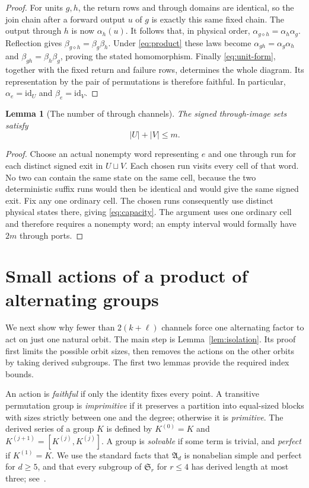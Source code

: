 \documentclass[11pt,a4paper]{article}
\newtheorem{lemma}[theorem]{Lemma}
\theoremstyle{definition}
\theoremstyle{remark}
\newcommand{\Alt}{\mathfrak A}
\newcommand{\Sym}{\mathfrak S}
\begin{document}
\begin{proof}
For units $g,h$, the return rows and through domains are identical,
so the join chain after a forward output $u$ of $g$ is exactly this
same fixed chain. The output through $h$ is now $\alpha_h(u)$.
It follows that, in physical order,
$\alpha_{g\diamond h}=\alpha_h\alpha_g$. Reflection gives
$\beta_{g\diamond h}=\beta_g\beta_h$. Under \eqref{eq:product} these laws become
$\alpha_{gh}=\alpha_g\alpha_h$ and
$\beta_{gh}=\beta_h\beta_g$, proving the stated homomorphism.
Finally \eqref{eq:unit-form}, together with the fixed return and failure rows,
determines the whole diagram. Its representation by the pair of
permutations is therefore faithful. In particular,
$\alpha_e=\mathrm{id}_U$ and $\beta_e=\mathrm{id}_V$.
\end{proof}

\begin{lemma}[The number of through channels]\label{lem:capacity}
The signed through-image sets satisfy
\begin{equation}\label{eq:capacity}
                              |U|+|V|\le m.
\end{equation}
\end{lemma}
\begin{proof}
Choose an actual nonempty word representing $e$ and one through run
for each distinct signed exit in $U\sqcup V$. Each chosen run
visits every cell of that word. No two can contain the same state
on the same cell, because the two deterministic suffix runs would
then be identical and would give the same signed exit. Fix any one
ordinary cell. The chosen runs consequently use distinct physical
states there, giving \eqref{eq:capacity}. The argument uses one
ordinary cell and therefore requires a nonempty word; an empty
interval would formally have $2m$ through ports.
\end{proof}

\section{Small actions of a product of alternating groups}\label{sec:groups}

We next show why fewer than $2(k+\ell)$ channels force one alternating
factor to act on just one natural orbit. The main step is
Lemma~\ref{lem:isolation}. Its proof first limits the possible orbit
sizes, then removes the actions on the other orbits by taking derived
subgroups. The first two lemmas provide the required index bounds.

An action is \emph{faithful} if only the identity fixes every point.
A transitive permutation group is \emph{imprimitive} if it preserves
a partition into equal-sized blocks with sizes strictly between one
and the degree; otherwise it is \emph{primitive}. The derived series
of a group $K$ is defined by $K^{(0)}=K$ and
$K^{(j+1)}=[K^{(j)},K^{(j)}]$. A group is \emph{solvable} if some
term is trivial, and \emph{perfect} if $K^{(1)}=K$. We use the
standard facts that $\Alt_d$ is nonabelian simple and perfect for
$d\ge5$, and that every subgroup of $\Sym_r$ for $r\le4$ has
derived length at most three; see~\cite{DixonMortimer1996}.
\end{document}
